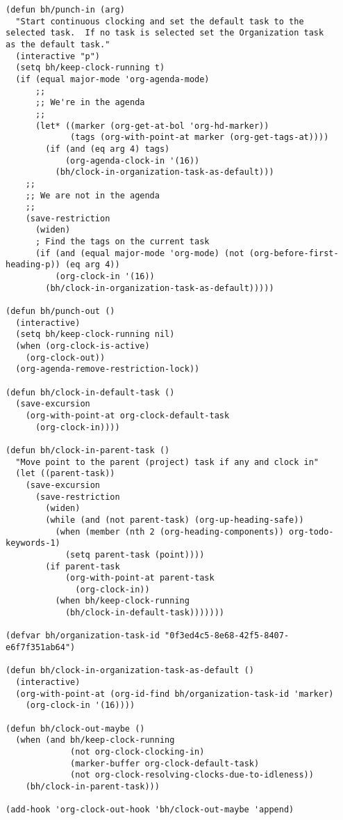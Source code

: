 \documentclass[11pt]{scrartcl}
\begin{document}
\begin{verbatim}
(defun bh/punch-in (arg)
  "Start continuous clocking and set the default task to the
selected task.  If no task is selected set the Organization task
as the default task."
  (interactive "p")
  (setq bh/keep-clock-running t)
  (if (equal major-mode 'org-agenda-mode)
      ;;
      ;; We're in the agenda
      ;;
      (let* ((marker (org-get-at-bol 'org-hd-marker))
             (tags (org-with-point-at marker (org-get-tags-at))))
        (if (and (eq arg 4) tags)
            (org-agenda-clock-in '(16))
          (bh/clock-in-organization-task-as-default)))
    ;;
    ;; We are not in the agenda
    ;;
    (save-restriction
      (widen)
      ; Find the tags on the current task
      (if (and (equal major-mode 'org-mode) (not (org-before-first-heading-p)) (eq arg 4))
          (org-clock-in '(16))
        (bh/clock-in-organization-task-as-default)))))

(defun bh/punch-out ()
  (interactive)
  (setq bh/keep-clock-running nil)
  (when (org-clock-is-active)
    (org-clock-out))
  (org-agenda-remove-restriction-lock))

(defun bh/clock-in-default-task ()
  (save-excursion
    (org-with-point-at org-clock-default-task
      (org-clock-in))))

(defun bh/clock-in-parent-task ()
  "Move point to the parent (project) task if any and clock in"
  (let ((parent-task))
    (save-excursion
      (save-restriction
        (widen)
        (while (and (not parent-task) (org-up-heading-safe))
          (when (member (nth 2 (org-heading-components)) org-todo-keywords-1)
            (setq parent-task (point))))
        (if parent-task
            (org-with-point-at parent-task
              (org-clock-in))
          (when bh/keep-clock-running
            (bh/clock-in-default-task)))))))

(defvar bh/organization-task-id "0f3ed4c5-8e68-42f5-8407-e6f7f351ab64")

(defun bh/clock-in-organization-task-as-default ()
  (interactive)
  (org-with-point-at (org-id-find bh/organization-task-id 'marker)
    (org-clock-in '(16))))

(defun bh/clock-out-maybe ()
  (when (and bh/keep-clock-running
             (not org-clock-clocking-in)
             (marker-buffer org-clock-default-task)
             (not org-clock-resolving-clocks-due-to-idleness))
    (bh/clock-in-parent-task)))

(add-hook 'org-clock-out-hook 'bh/clock-out-maybe 'append)
\end{verbatim}
\end{document}
